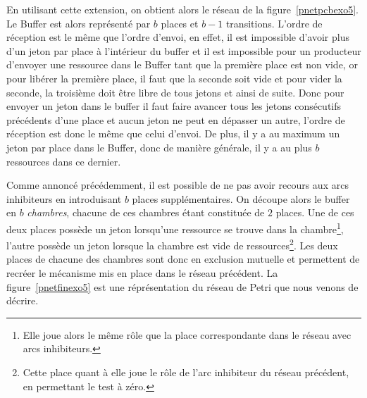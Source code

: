 En utilisant cette extension, on obtient alors le réseau de la figure~\ref{pnetpcbexo5}. Le Buffer
est alors représenté par $b$ places et $b-1$ transitions. L'ordre de réception est le même que
l'ordre d'envoi, en effet, il est impossible d'avoir plus d'un jeton par place à l'intérieur du
buffer et il est impossible pour un producteur d'envoyer une ressource dans le Buffer tant que la
première place est non vide, or pour libérer la première place, il faut que la seconde soit vide et
pour vider la seconde, la troisième doit être libre de tous jetons et ainsi de suite. Donc pour
envoyer un jeton dans le buffer il faut faire avancer tous les jetons consécutifs précédents d'une
place et aucun jeton ne peut en dépasser un autre, l'ordre de réception est donc le même que celui
d'envoi. De plus, il y a au maximum un jeton par place dans le Buffer, donc de manière générale, il
y a au plus $b$ ressources dans ce dernier.

Comme annoncé précédemment, il est possible de ne pas avoir recours aux arcs inhibiteurs en
introduisant $b$ places supplémentaires. On découpe alors le buffer en $b$ \emph{chambres}, chacune
de ces chambres étant constituée de $2$ places. Une de ces deux places possède un jeton lorsqu'une
ressource se trouve dans la chambre\footnote{Elle joue alors le même rôle que la place
correspondante dans le réseau avec arcs inhibiteurs.}, l'autre possède un jeton lorsque la chambre
est vide de ressources\footnote{Cette place quant à elle joue le rôle de l'arc inhibiteur du réseau
précédent, en permettant le test à zéro.}. Les deux places de chacune des chambres sont donc en
exclusion mutuelle et permettent de recréer le mécanisme mis en place dans le réseau précédent. La
figure~\ref{pnetfinexo5} est une réprésentation du réseau de Petri que nous venons de décrire.
